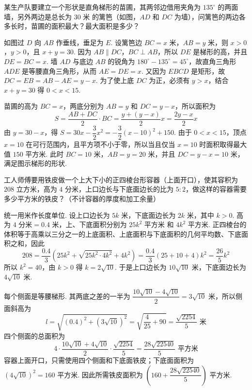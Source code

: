 \begin{problem}
某生产队要建立一个形状是直角梯形的苗圃，其两邻边借用夹角为 \(135^\circ\) 的两面墙，另外两边是总长为 \(30\text{ 米}\) 的篱笆（如图，\(AD\) 和 \(DC\) 为墙），问篱笆的两边各多长时，苗圃的面积最大？最大面积是多少？

\end{problem}

\begin{solution}
如图过 \(D\) 向 \(AB\) 作垂线，垂足为 \(E\). 设篱笆边 \(BC=x\text{ 米}\)，\(AB=y\text{ 米}\)，则 \(x>0\)，\(y>0\)，且 \(x+y=30\). 因为 \(AB\parallel DC\)，\(BC\perp AB\)，所以 \(DE\) 是梯形的高，并且 \(DE=BC=x\). 墙 \(AD\) 与底边 \(AB\) 的锐角为 \(180^\circ-135^\circ=45^\circ\)，故直角三角形 \(ADE\) 是等腰直角三角形，从而 \(AE=DE=x\). 又因为 \(EBCD\) 是矩形，故 \(DC=EB=AB-AE=y-x\). 为了使上底 \(DC\) 为正，必须有 \(y>x\)，结合 \(x+y=30\) 得 \(0<x<15\).

苗圃的高为 \(BC=x\)，两底分别为 \(AB=y\) 和 \(DC=y-x\)，所以面积为
\[
S=\frac{AB+DC}{2}\cdot BC=\frac{y+(y-x)}{2}x=\frac{2y-x}{2}x
\]
由 \(y=30-x\)，得 \(S=30x-\dfrac{3}{2}x^2=-\dfrac{3}{2}\left(x-10\right)^2+150\). 由于 \(0<x<15\)，顶点 \(x=10\) 在可行范围内，且平方项不小于零，所以当且仅当 \(x=10\) 时面积取得最大值 \(150\text{ 平方米}\). 此时 \(BC=10\text{ 米}\)，\(AB=y=20\text{ 米}\)，并且 \(DC=y-x=10\text{ 米}\)，满足图示梯形的形状.
\end{solution}

\begin{problem}
工人师傅要用铁皮做一个上大下小的正四棱台形容器（上面开口），使其容积为 \(208\text{ 立方米}\)，高为 \(4\text{ 分米}\)，上口边长与下底面边长的比为 \(5:2\)，做这样的容器需要多少平方米的铁皮？（不计容器的厚度和加工余量）
\end{problem}

\begin{solution}
统一用米作长度单位. 设上口边长为 \(5k\text{ 米}\)，下底面边长为 \(2k\text{ 米}\)，其中 \(k>0\). 高为 \(4\text{ 分米}=0.4\text{ 米}\)，上、下底面积分别为 \(25k^2\text{ 平方米}\) 和 \(4k^2\text{ 平方米}\). 正四棱台的体积等于高乘以三分之一的上底面积、上底面积与下底面积的几何平均数、下底面积之和，因此
\[
208=\frac{0.4}{3}\left(25k^2+\sqrt{25k^2\cdot4k^2}+4k^2\right)=\frac{0.4}{3}\left(25+10+4\right)k^2=\frac{26}{5}k^2
\]
所以 \(k^2=40\)，由 \(k>0\) 得 \(k=2\sqrt{10}\). 于是上口边长为 \(10\sqrt{10}\text{ 米}\)，下底面边长为 \(4\sqrt{10}\text{ 米}\).

每个侧面是等腰梯形. 其两底之差的一半为 \(\dfrac{10\sqrt{10}-4\sqrt{10}}{2}=3\sqrt{10}\text{ 米}\)，所以侧面斜高为
\[
l=\sqrt{\left(0.4\right)^2+\left(3\sqrt{10}\right)^2}=\sqrt{\frac{4}{25}+90}=\frac{\sqrt{2254}}{5}\text{ 米}
\]
四个侧面的总面积为
\[
4\cdot\frac{10\sqrt{10}+4\sqrt{10}}{2}\cdot\frac{\sqrt{2254}}{5}=\frac{28\sqrt{22540}}{5}\text{ 平方米}
\]
容器上面开口，只需使用四个侧面和下底面铁皮；下底面面积为 \(\left(4\sqrt{10}\right)^2=160\text{ 平方米}\). 因此所需铁皮面积为 \(\left(160+\dfrac{28\sqrt{22540}}{5}\right)\text{ 平方米}\).
\end{solution}

